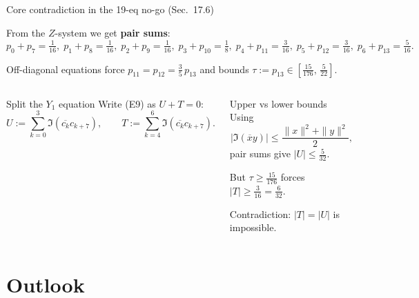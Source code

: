 \documentclass[aspectratio=169,t]{beamer}
\begin{document}
\begin{frame}{Core contradiction in the 19-eq no-go (Sec.~17.6)}

From the $Z$-system we get \textbf{pair sums}:
{\small
\[
p_0+p_7=\tfrac{1}{16},\;
p_1+p_8=\tfrac{1}{16},\;
p_2+p_9=\tfrac{1}{16},\;
p_3+p_{10}=\tfrac{1}{8},\;
p_4+p_{11}=\tfrac{3}{16},\;
p_5+p_{12}=\tfrac{3}{16},\;
p_6+p_{13}=\tfrac{5}{16}.
\]
}

Off-diagonal equations force $p_{11}=p_{12}=\tfrac35\,p_{13}$ and bounds
$\tau:=p_{13}\in[\tfrac{15}{176},\,\tfrac{5}{22}]$.

\begin{columns}[T]
\begin{block}{Split the $Y_1$ equation}
Write (E9) as $U+T=0$:
\[
U:=\sum_{k=0}^3 \Im(\overline{c_k}c_{k+7}),\qquad
T:=\sum_{k=4}^6 \Im(\overline{c_k}c_{k+7}).
\]
\end{block}

\begin{alertblock}{Upper vs lower bounds}
Using
\[
|\Im(\overline{x}y)| \le \frac{\|x\|^2+\|y\|^2}{2},
\]
pair sums give $|U|\le \tfrac{5}{32}$.

But $\tau\ge \tfrac{15}{176}$ forces $|T|\ge \tfrac{3}{16}=\tfrac{6}{32}$.

Contradiction: $|T|=|U|$ is impossible.
\end{alertblock}
\end{columns}
\end{frame}

\section{Outlook}
\end{document}
